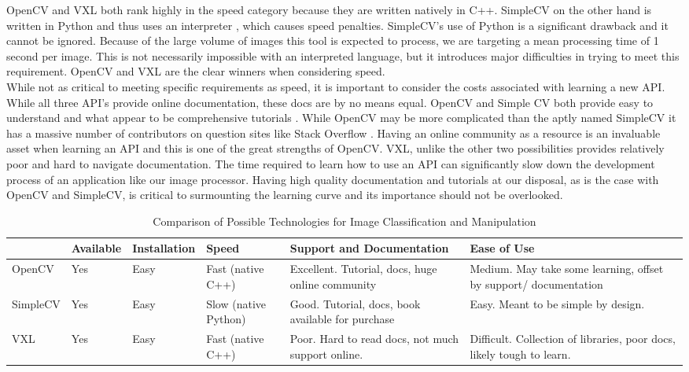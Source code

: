 \documentclass[10pt, onecolumn, draftclsnofoot, letterpaper, compsoc]{IEEEtran}
\begin{document}
OpenCV and VXL both rank highly in the speed category because they are written
natively in C++\cite{OCV, VXL}. SimpleCV on the other hand is written in Python
and thus uses an interpreter \cite{SCV}, which causes speed penalties.
SimpleCV’s use of Python is a significant drawback and it cannot be ignored.
Because of the large volume of images this tool is expected to process, we are
targeting a mean processing time of 1 second per image. This is not necessarily
impossible with an interpreted language, but it introduces major difficulties in
trying to meet this requirement. OpenCV and VXL are the clear winners when
considering speed. \\

While not as critical to meeting specific requirements as speed, it is important
to consider the costs associated with learning a new API. While all three API's
provide online documentation, these docs are by no means equal. OpenCV and
Simple CV both provide easy to understand and what appear to be comprehensive
tutorials \cite{OCV, SCV}. While OpenCV may be more complicated than the aptly
named SimpleCV it has a massive number of contributors on question sites like
Stack Overflow \cite{stkovrflw}. Having an online community as a resource is an
invaluable asset when learning an API and this is one of the great strengths of
OpenCV. VXL, unlike the other two possibilities provides relatively poor and
hard to navigate documentation. The time required to learn how to use an API can
significantly slow down the development process of an application like our image
processor. Having high quality documentation and tutorials at our disposal, as
is the case with OpenCV and SimpleCV, is critical to surmounting the learning
curve and its importance should not be overlooked. \\

\begin{table}[h]
\centering
\caption{Comparison of Possible Technologies for Image Classification and Manipulation}
\begin{tabular}{|p{1.8cm}|p{1.8cm}|p{1.8cm}|p{1.8cm}|p{1.8cm}|p{1.8cm}|}
\cline{4-4}

\hline  & Available & Installation & Speed & Support and Documentation & Ease of
Use  \\ \hline

OpenCV  & Yes & Easy & Fast (native C++) &  Excellent. Tutorial, docs, huge
online community & Medium. May take some learning, offset by support/
documentation  \\ \hline

SimpleCV & Yes & Easy & Slow (native Python) & Good. Tutorial, docs, book
available for purchase & Easy. Meant to be simple by design.  \\ \hline

VXL & Yes & Easy & Fast (native C++) & Poor. Hard to read docs, not much support
online. & Difficult. Collection of libraries, poor docs, likely tough to learn.
\\ \hline

\end{tabular}
\label{table:george1}
\end{table}
\end{document}
